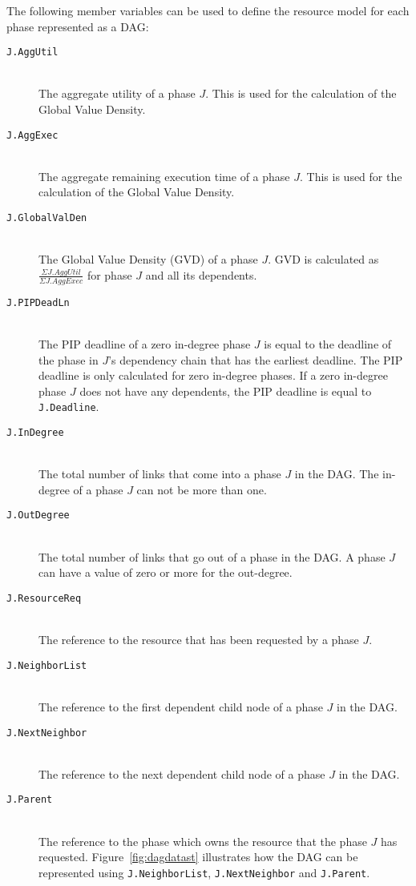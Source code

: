 \documentclass[12pt,dvips]{report}
\begin{document}
The following member variables can be used to define the resource model for each phase represented as a DAG:

\begin{description}
	\item[\texttt{J.AggUtil}] \hfill \\
		The aggregate utility of a phase $J$. This is used for the calculation of
		the Global Value Density.

	\item[\texttt{J.AggExec}] \hfill \\
		The aggregate remaining execution time of a phase $J$. This is used for the
		calculation of the Global Value Density.

	\item[\texttt{J.GlobalValDen}] \hfill \\
		The Global Value Density (GVD) of a phase $J$. GVD is calculated as $\frac{\Sigma J.AggUtil}{\Sigma J.AggExec}$
 		for phase $J$ and all its dependents.
 		
	\item[\texttt{J.PIPDeadLn}] \hfill \\
		 The PIP deadline of a zero in-degree phase $J$
		 is equal to the deadline of the phase in $J$'s dependency chain that has the earliest deadline.
		 The PIP deadline is only calculated for zero in-degree phases. If a zero in-degree phase $J$ does
		 not have any dependents, the PIP deadline is equal to \texttt{J.Deadline}.
 		
	\item[\texttt{J.InDegree}] \hfill \\
		The total number of links that come into a phase $J$ in the DAG. The in-degree of a phase 
		$J$ can not be more than one.

	\item[\texttt{J.OutDegree}] \hfill \\
		The total number of links that go out of a phase in the DAG. A phase $J$ can have a value
		of zero or more for the out-degree.

	\item[\texttt{J.ResourceReq}] \hfill \\
		The reference to the resource that has been requested by a phase $J$.

	\item[\texttt{J.NeighborList}] \hfill \\
		The reference to the first dependent child node of a phase $J$ in the DAG. 

	\item[\texttt{J.NextNeighbor}] \hfill \\
		The reference to the next dependent child node of a phase $J$ in the DAG.

	\item[\texttt{J.Parent}] \hfill \\
		The reference to the phase which owns the resource that the phase $J$ has requested.
		Figure~\ref{fig:dagdatast} illustrates how the DAG can be represented using 
		\texttt{J.NeighborList}, \texttt{J.NextNeighbor} and \texttt{J.Parent}.
\end{description}
\end{document}
